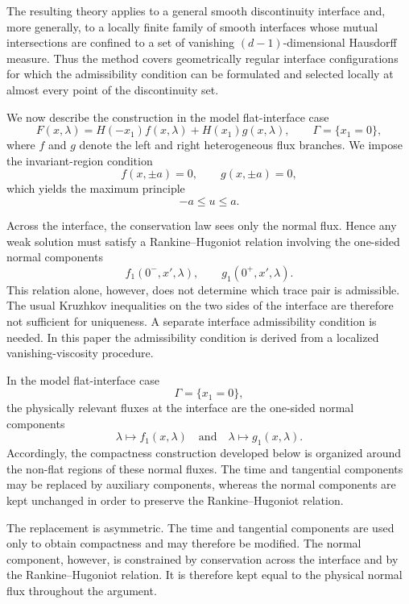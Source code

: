 \documentclass[11pt]{amsart}
\numberwithin{equation}{section}
\theoremstyle{plain}
\theoremstyle{definition}
\theoremstyle{remark}
\begin{document}
The resulting theory applies to a general smooth discontinuity interface and,
more generally, to a locally finite family of smooth interfaces whose mutual
intersections are confined to a set of vanishing
\((d-1)\)-dimensional Hausdorff measure. Thus the method covers geometrically
regular interface configurations for which the admissibility condition can be
formulated and selected locally at almost every point of the discontinuity
set.


We now describe the construction in the model flat-interface case
\begin{equation}\label{eq:intro-flat-flux}
    F(x,\lambda)
    =
    H(-x_1)f(x,\lambda)+H(x_1)g(x,\lambda),
    \qquad
    \Gamma=\{x_1=0\},
\end{equation}
where \(f\) and \(g\) denote the left and right heterogeneous flux branches. We
impose the invariant-region condition
\begin{equation}\label{eq:intro-invariant}
    f(x,\pm a)=0,
    \qquad
    g(x,\pm a)=0,
\end{equation}
which yields the maximum principle
\[
    -a\leq u\leq a .
\]

Across the interface, the conservation law sees only the normal flux. Hence any
weak solution must satisfy a Rankine--Hugoniot relation involving the one-sided
normal components
\[
    f_1(0^-,x',\lambda),
    \qquad
    g_1(0^+,x',\lambda).
\]
This relation alone, however, does not determine which trace pair is
admissible. The usual Kruzhkov inequalities on the two sides of the interface
are therefore not sufficient for uniqueness. A separate interface
admissibility condition is needed. In this paper the admissibility condition is
derived from a localized vanishing-viscosity procedure.


In the model flat-interface case
\[
    \Gamma=\{x_1=0\},
\]
the physically relevant fluxes at the interface are the one-sided normal
components
\[
    \lambda\longmapsto f_1(x,\lambda)
    \quad\text{and}\quad
    \lambda\longmapsto g_1(x,\lambda).
\]
Accordingly, the compactness construction developed below is organized around
the non-flat regions of these normal fluxes. The time and tangential components
may be replaced by auxiliary components, whereas the normal components are
kept unchanged in order to preserve the Rankine--Hugoniot relation.


The replacement is asymmetric. The time and tangential components are used only
to obtain compactness and may therefore be modified. The normal component,
however, is constrained by conservation across the interface and by the
Rankine--Hugoniot relation. It is therefore kept equal to the physical normal
flux throughout the argument.
\end{document}
